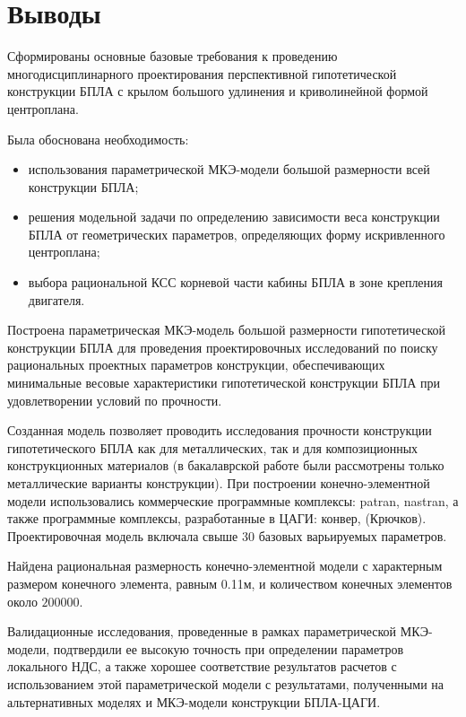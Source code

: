 \chapter*{Выводы}

Сформированы основные базовые требования к проведению многодисциплинарного проектирования перспективной гипотетической конструкции БПЛА с крылом большого удлинения и криволинейной формой центроплана. 

Была обоснована необходимость:
\begin{itemize}
\item использования параметрической МКЭ-модели большой размерности всей конструкции БПЛА;
\item решения модельной задачи по определению зависимости веса конструкции БПЛА от геометрических параметров, определяющих форму искривленного центроплана;
\item выбора рациональной КСС корневой части кабины БПЛА в зоне крепления двигателя.
\end{itemize}

Построена параметрическая МКЭ-модель большой размерности гипотетической конструкции БПЛА для проведения проектировочных исследований по поиску рациональных проектных параметров конструкции, обеспечивающих минимальные весовые характеристики гипотетической конструкции БПЛА при удовлетворении условий по прочности. 

Созданная модель позволяет проводить исследования прочности конструкции гипотетического БПЛА как для металлических, так и для композиционных конструкционных материалов (в бакалаврской работе были рассмотрены только металлические варианты конструкции). При построении конечно-элементной модели использовались коммерческие программные комплексы: patran, nastran, а также программные комплексы, разработанные в ЦАГИ: конвер, (Крючков).
Проектировочная модель  включала свыше 30 базовых варьируемых параметров. 

Найдена рациональная размерность конечно-элементной модели с характерным размером конечного элемента, равным 0.11м, и количеством конечных элементов около $200000$. 

Валидационные исследования, проведенные в рамках параметрической МКЭ-модели, подтвердили ее высокую точность при определении параметров локального НДС, а также хорошее соответствие результатов расчетов с использованием этой параметрической модели с результатами, полученными на альтернативных моделях и МКЭ-модели конструкции БПЛА-ЦАГИ. 



